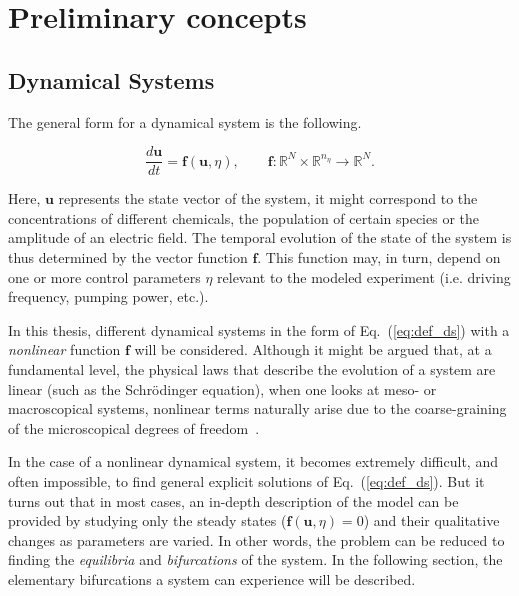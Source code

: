 \chapter{Preliminary concepts}

\label{ch:preliminary}

\section{Dynamical Systems}


The general form for a dynamical system is the following.

\begin{equation}
    \dfrac{d\bm{u}}{dt} = \bm{f}(\bm{u}, \eta), \qquad \bm{f} : \mathbb{R}^N \times \mathbb{R}^{n_\eta} \to \mathbb{R}^N.
    \label{eq:def_ds}
\end{equation}

Here, $\bm{u}$ represents the state vector of the system, it might correspond to the
concentrations of different chemicals, the population of certain species or the amplitude
of an electric field. The temporal evolution of the state of the system is thus determined by 
the vector function $\bm{f}$. This function may, in turn, depend on one or more control
parameters $\eta$ relevant to the modeled experiment (i.e. driving frequency, pumping power, etc.).

In this thesis, different dynamical systems in the form of Eq.~(\ref{eq:def_ds}) with a {\em nonlinear} function
$\bm{f}$ will be considered. Although it might be argued that, at a fundamental level, the physical laws
that describe the evolution of a system are linear (such as the Schrödinger equation), when one looks at meso- or macroscopical
systems, nonlinear terms naturally arise due to the coarse-graining of the microscopical degrees of freedom~\cite{kardar2007statistical}.


In the case of a nonlinear dynamical system, it becomes extremely difficult, and often impossible, to find
general explicit solutions of Eq.~(\ref{eq:def_ds}). But it turns out that in most cases, an in-depth
description of the model can be provided by studying only the steady states ($\bm{f}(\bm{u}, \eta) = 0$) and their qualitative changes as parameters 
are varied. In other words, the problem can be reduced to finding the {\em equilibria} and {\em bifurcations} of the system.
In the following section, the elementary bifurcations a system can experience will be described.

